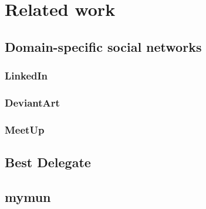 \chapter{Related work}
\label{chapter:relatedwork}

\section{Domain-specific social networks}
\subsection{LinkedIn}
\subsection{DeviantArt}
\subsection{MeetUp}

\section{Best Delegate}

\section{mymun}

